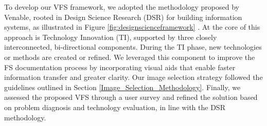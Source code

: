 \documentclass[manuscript,screen,review]{acmart}
\begin{document}
	To develop our VFS framework, we adopted the methodology proposed by Venable, rooted in Design Science Research (DSR) for building information systems, as illustrated in Figure \ref{fig:designscienceframework} \cite{Venable2006TheRO}. At the core of this approach is Technology Innovation (TI), supported by three closely interconnected, bi-directional components. During the TI phase, new technologies or methods are created or refined. We leveraged this component to improve the FS documentation process by incorporating visual aids that enable faster information transfer and greater clarity. Our image selection strategy followed the guidelines outlined in Section \ref{Image_Selection_Methodology}. Finally, we assessed the proposed VFS through a user survey and refined the solution based on problem diagnosis and technology evaluation, in line with the DSR methodology.



\end{document}

